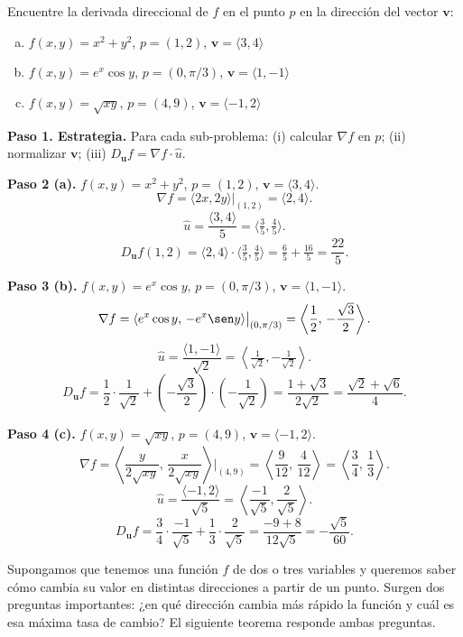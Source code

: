 \begin{prob}
Encuentre la derivada direccional de $f$ en el punto $p$ en la dirección
del vector $\mathbf{v}$:
\begin{enumerate}[a)]
    \item $f(x,y) = x^2 + y^2$, $p=(1,2)$, $\mathbf{v} = \langle 3,4 \rangle$
    \item $f(x,y) = e^x \cos y$, $p=(0,\pi/3)$, $\mathbf{v} = \langle 1,-1 \rangle$
    \item $f(x,y) = \sqrt{xy}$, $p=(4,9)$, $\mathbf{v} = \langle -1,2 \rangle$
\end{enumerate}
\begin{myproof}
\textbf{Paso 1. Estrategia.}
Para cada sub-problema: (i) calcular $\nabla f$ en $p$; (ii) normalizar $\mathbf{v}$; (iii) $D_\mathbf{u}f=\nabla f\cdot\hat{u}$.

\textbf{Paso 2 (a).} $f(x,y)=x^2+y^2$, $p=(1,2)$, $\mathbf{v}=\langle 3,4\rangle$.
\[
\nabla f=\langle 2x,2y\rangle\big|_{(1,2)}=\langle 2,4\rangle.
\]
\[
\hat{u}=\frac{\langle 3,4\rangle}{5}=\langle\tfrac{3}{5},\tfrac{4}{5}\rangle.
\]
\[
D_\mathbf{u}f(1,2)=\langle 2,4\rangle\cdot\langle\tfrac{3}{5},\tfrac{4}{5}\rangle
=\tfrac{6}{5}+\tfrac{16}{5}=\boxed{\dfrac{22}{5}}.
\]

\textbf{Paso 3 (b).} $f(x,y)=e^x\cos y$, $p=(0,\pi/3)$, $\mathbf{v}=\langle 1,-1\rangle$.
\[
\nabla f=\langle e^x\cos y,\,-e^x\sen y\rangle\big|_{(0,\pi/3)}
=\left\langle\frac{1}{2},\,-\frac{\sqrt{3}}{2}\right\rangle.
\]
\[
\hat{u}=\frac{\langle 1,-1\rangle}{\sqrt{2}}=\left\langle\tfrac{1}{\sqrt{2}},-\tfrac{1}{\sqrt{2}}\right\rangle.
\]
\[
D_\mathbf{u}f=\frac{1}{2}\cdot\frac{1}{\sqrt{2}}+\left(-\frac{\sqrt{3}}{2}\right)\cdot\left(-\frac{1}{\sqrt{2}}\right)
=\frac{1+\sqrt{3}}{2\sqrt{2}}=\boxed{\dfrac{\sqrt{2}+\sqrt{6}}{4}}.
\]

\textbf{Paso 4 (c).} $f(x,y)=\sqrt{xy}$, $p=(4,9)$, $\mathbf{v}=\langle -1,2\rangle$.
\[
\nabla f=\left\langle\frac{y}{2\sqrt{xy}},\,\frac{x}{2\sqrt{xy}}\right\rangle\bigg|_{(4,9)}
=\left\langle\frac{9}{12},\,\frac{4}{12}\right\rangle=\left\langle\frac{3}{4},\,\frac{1}{3}\right\rangle.
\]
\[
\hat{u}=\frac{\langle -1,2\rangle}{\sqrt{5}}=\left\langle\frac{-1}{\sqrt{5}},\frac{2}{\sqrt{5}}\right\rangle.
\]
\[
D_\mathbf{u}f=\frac{3}{4}\cdot\frac{-1}{\sqrt{5}}+\frac{1}{3}\cdot\frac{2}{\sqrt{5}}
=\frac{-9+8}{12\sqrt{5}}=\boxed{-\dfrac{\sqrt{5}}{60}}.
\]
\end{myproof}
\end{prob}

Supongamos que tenemos una función $f$ de dos o tres variables y queremos saber cómo cambia su valor en distintas direcciones a partir de un punto. Surgen dos preguntas importantes: ¿en qué dirección cambia más rápido la función y cuál es esa máxima tasa de cambio? El siguiente teorema responde ambas preguntas.

